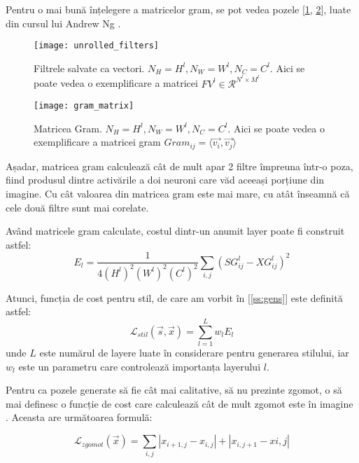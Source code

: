 Pentru o mai bună înțelegere a matricelor gram, se pot vedea pozele [\ref{fig:unrolled_filters}, \ref{fig:gram_matrix}], luate din cursul lui Andrew Ng \cite{coursera_gram}.

\begin{figure}[H]
		\centering
        \texttt{[image: unrolled\_filters]}
        \caption{Filtrele salvate ca vectori. $N_H = H^l, N_W = W^l, N_C = C^l$. Aici se poate vedea o exemplificare a matricei $FV^l \in \mathcal{R}^{N^{l} \times M^{l}}$}
        \label{fig:unrolled_filters}
\end{figure}
\begin{figure}[H]
		\centering
        \texttt{[image: gram\_matrix]}
        \caption{Matricea Gram. $N_H = H^l, N_W = W^l, N_C = C^l$. Aici se poate vedea o exemplificare a matricei gram $Gram_{ij} = \langle {\vec{v_i}, \vec{v_j}} \rangle$}
        \label{fig:gram_matrix}
\end{figure}

Așadar, matricea gram calculează cât de mult apar 2 filtre împreuna într-o poza, fiind produsul dintre activările a doi neuroni care văd aceeași porțiune din imagine. Cu cât valoarea din matricea gram este mai mare, cu atât înseamnă că cele două filtre sunt mai corelate.

Având matricele gram calculate, costul dintr-un anumit layer poate fi construit astfel:
\begin{equation}
\label{eq:layer_style_loss}
E_l = \frac{1}{4(H^{l})^{2}(W^{l})^{2}(C^{l})^{2}} \sum_{i, j}{(SG_{ij}^l - XG_{ij}^l)^2}
\end{equation}

Atunci, funcția de cost pentru stil, de care am vorbit în [\ref{ss:gens}] este definită astfel:
\begin{equation}
\label{eq:style_loss}
\mathcal{L}_{stil}(\vec{s}, \vec{x}) = \sum_{l=1}^{L} w_l E_l
\end{equation}
unde $L$ este numărul de layere luate în considerare pentru generarea stilului, iar $w_l$ este un parametru care controlează importanța layerului $l$.

Pentru ca pozele generate să fie cât mai calitative, să nu prezinte zgomot, o să mai definesc o funcție de cost care calculează cât de mult zgomot este în imagine \cite{tvd}. Aceasta are următoarea formulă:

\begin{equation}
\label{eq:tv_loss}
\mathcal{L}_{zgomot}(\vec{x}) = \sum_{i, j} |x_{i+1, j} - x_{i, j}| + |x_{i, j + 1} - x{i, j}|
\end{equation}

